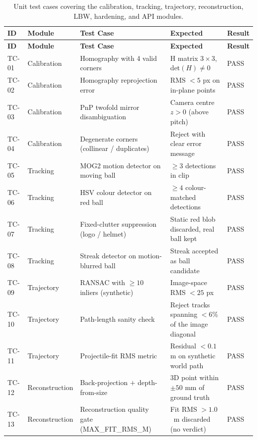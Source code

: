 \documentclass[12pt,a4paper]{report}
\begin{document}
\begin{longtable}{|p{0.9cm}|p{2.3cm}|p{4.0cm}|p{4.0cm}|p{0.9cm}|}
\caption{Unit test cases covering the calibration, tracking, trajectory, reconstruction, LBW, hardening, and API modules.}\label{tab:unit-tests}\\
\hline
\textbf{ID} & \textbf{Module} & \textbf{Test Case} & \textbf{Expected} & \textbf{Result} \\
\hline
\endfirsthead
\hline
\textbf{ID} & \textbf{Module} & \textbf{Test Case} & \textbf{Expected} & \textbf{Result} \\
\hline
\endhead
TC-01 & Calibration & Homography with 4 valid corners & H matrix $3 \times 3$, det$(H) \neq 0$ & PASS \\
\hline
TC-02 & Calibration & Homography reprojection error & RMS $< 5$ px on in-plane points & PASS \\
\hline
TC-03 & Calibration & PnP twofold mirror disambiguation & Camera centre $z > 0$ (above pitch) & PASS \\
\hline
TC-04 & Calibration & Degenerate corners (collinear / duplicates) & Reject with clear error message & PASS \\
\hline
TC-05 & Tracking & MOG2 motion detector on moving ball & $\geq 3$ detections in clip & PASS \\
\hline
TC-06 & Tracking & HSV colour detector on red ball & $\geq 4$ colour-matched detections & PASS \\
\hline
TC-07 & Tracking & Fixed-clutter suppression (logo / helmet) & Static red blob discarded, real ball kept & PASS \\
\hline
TC-08 & Tracking & Streak detector on motion-blurred ball & Streak accepted as ball candidate & PASS \\
\hline
TC-09 & Trajectory & RANSAC with $\geq 10$ inliers (synthetic) & Image-space RMS $< 25$ px & PASS \\
\hline
TC-10 & Trajectory & Path-length sanity check & Reject tracks spanning $< 6\%$ of the image diagonal & PASS \\
\hline
TC-11 & Trajectory & Projectile-fit RMS metric & Residual $< 0.1$ m on synthetic world path & PASS \\
\hline
TC-12 & Reconstruction & Back-projection $+$ depth-from-size & 3D point within $\pm 50$ mm of ground truth & PASS \\
\hline
TC-13 & Reconstruction & Reconstruction quality gate (MAX\_FIT\_RMS\_M) & Fit RMS $> 1.0$~m discarded (no verdict) & PASS \\
\hline

\end{longtable}
\end{document}
